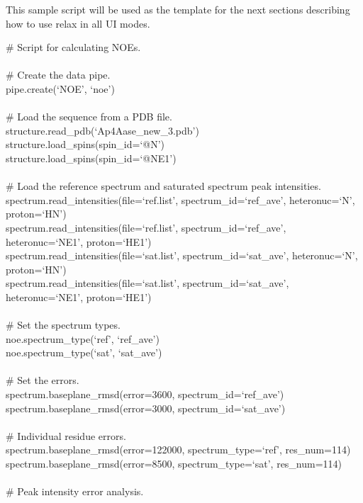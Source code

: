 This sample script will be used as the template for the next sections describing how to use relax in all UI modes.

\begin{exampleenv}
\# Script for calculating NOEs. \\
 \\
\# Create the data pipe. \\
pipe.create(`NOE', `noe') \\
 \\
\# Load the sequence from a PDB file. \\
structure.read\_pdb(`Ap4Aase\_new\_3.pdb') \\
structure.load\_spins(spin\_id=`@N') \\
structure.load\_spins(spin\_id=`@NE1') \\
 \\
\# Load the reference spectrum and saturated spectrum peak intensities. \\
spectrum.read\_intensities(file=`ref.list', spectrum\_id=`ref\_ave', heteronuc=`N', proton=`HN') \\
spectrum.read\_intensities(file=`ref.list', spectrum\_id=`ref\_ave', heteronuc=`NE1', proton=`HE1') \\
spectrum.read\_intensities(file=`sat.list', spectrum\_id=`sat\_ave', heteronuc=`N', proton=`HN') \\
spectrum.read\_intensities(file=`sat.list', spectrum\_id=`sat\_ave', heteronuc=`NE1', proton=`HE1') \\
 \\
\# Set the spectrum types. \\
noe.spectrum\_type(`ref', `ref\_ave') \\
noe.spectrum\_type(`sat', `sat\_ave') \\
 \\
\# Set the errors. \\
spectrum.baseplane\_rmsd(error=3600, spectrum\_id=`ref\_ave') \\
spectrum.baseplane\_rmsd(error=3000, spectrum\_id=`sat\_ave') \\
 \\
\# Individual residue errors. \\
spectrum.baseplane\_rmsd(error=122000, spectrum\_type=`ref', res\_num=114) \\
spectrum.baseplane\_rmsd(error=8500, spectrum\_type=`sat', res\_num=114) \\
 \\
\# Peak intensity error analysis. \\

\end{exampleenv}
